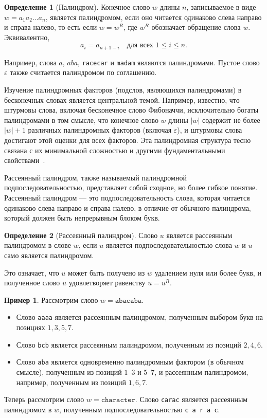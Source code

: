 \documentclass[a4paper,14pt]{extreport}
\theoremstyle{plain}
\theoremstyle{definition}
\newtheorem{definition}{Определение}[section]
\newtheorem{example}{Пример}
\theoremstyle{remark}
\begin{document}
\begin{definition}[Палиндром]
	Конечное слово $w$ длины $n$, записываемое в виде $w = a_1 a_2 \dots a_n$, является палиндромом, если оно читается одинаково слева направо и справа налево, то есть если $w = w^R$, где $w^R$ обозначает обращение слова $w$. Эквивалентно,
	\begin{equation}
		a_i = a_{n+1-i} \quad \text{для всех } 1 \leq i \leq n.
	\end{equation}
\end{definition}

Например, слова $a$, $aba$, \texttt{racecar} и \texttt{madam} являются палиндромами. Пустое слово $\varepsilon$ также считается палиндромом по соглашению.

Изучение палиндромных факторов (подслов, являющихся палиндромами) в бесконечных словах является центральной темой. Например, известно, что штурмовы слова, включая бесконечное слово Фибоначчи, исключительно богаты палиндромами в том смысле, что конечное слово $w$ длины $|w|$ содержит не более $|w|+1$ различных палиндромных факторов (включая $\varepsilon$), и штурмовы слова достигают этой оценки для всех факторов. Эта палиндромная структура тесно связана с их минимальной сложностью и другими фундаментальными свойствами~\cite{Droubay}.

Рассеянный палиндром, также называемый палиндромной подпоследовательностью, представляет собой сходное, но более гибкое понятие. Рассеянный палиндром --- это подпоследовательность слова, которая читается одинаково слева направо и справа налево, в отличие от обычного палиндрома, который должен быть непрерывным блоком букв.

\begin{definition}[Рассеянный палиндром]
	Слово $u$ является рассеянным палиндромом в слове $w$, если $u$ является подпоследовательностью слова $w$ и $u$ само является палиндромом.
\end{definition}

Это означает, что $u$ может быть получено из $w$ удалением нуля или более букв, и полученное слово $u$ удовлетворяет равенству $u = u^R$.

\begin{example}
	Рассмотрим слово $w = \texttt{abacaba}$.
	\begin{itemize}
		\item Слово \texttt{aaaa} является рассеянным палиндромом, полученным выбором букв на позициях $1,3,5,7$.
		\item Слово \texttt{bcb} является рассеянным палиндромом, полученным из позиций $2,4,6$.
		\item Слово \texttt{aba} является одновременно палиндромным фактором (в обычном смысле), полученным из позиций $1$--$3$ и $5$--$7$, и рассеянным палиндромом, например, полученным из позиций $1,6,7$.
	\end{itemize}
	Теперь рассмотрим слово $w = \texttt{character}$. Слово \texttt{carac} является рассеянным палиндромом в $w$, полученным подпоследовательностью \texttt{c a r a c}.
\end{example}
\end{document}
